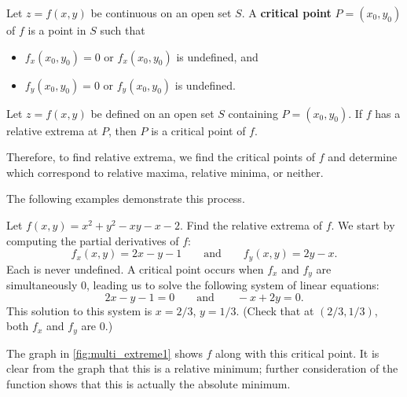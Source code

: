 \begin{definition}\label{def:multi_critical_point}%
Let $z = f(x,y)$ be continuous on an open set $S$. A \textbf{critical point} $P=(x_0,y_0)$ of $f$ is a point in $S$ such that
\begin{itemize}
	\item $f_x(x_0,y_0) = 0$ or $f_x(x_0,y_0)$ is undefined, and
	\item $f_y(x_0,y_0) = 0$ or $f_y(x_0,y_0)$ is undefined.
\end{itemize}
\end{definition}

\begin{theorem}\label{thm:multi_critical_point}%
Let $z=f(x,y)$ be defined on an open set $S$ containing $P=(x_0,y_0)$. If $f$ has a relative extrema at $P$, then $P$ is a critical point of $f$.
\end{theorem}

Therefore, to find relative extrema, we find the critical points of $f$ and determine which correspond to relative maxima, relative minima, or neither.


The following examples demonstrate this process.

\begin{example}\label{ex_multi_extreme1}%
Let $f(x,y) = x^2+y^2-xy-x-2$. Find the relative extrema of $f$.
\solution
We start by computing the partial derivatives of $f$:
%
%
\[f_x(x,y) = 2x-y-1 \qquad \text{and}\qquad f_y(x,y) = 2y-x.\]
Each is never undefined. A critical point occurs when $f_x$ and $f_y$ are simultaneously 0, leading us to solve the following system of linear equations:
\[2x-y-1 = 0\qquad \text{and}\qquad -x+2y = 0.\]
This solution to this system is $x=2/3$, $y=1/3$. (Check that at $(2/3,1/3)$, both $f_x$ and $f_y$ are 0.)

The graph in \autoref{fig:multi_extreme1} shows $f$ along with this critical point. It is clear from the graph that this is a relative minimum; further consideration of the function shows that this is actually the absolute minimum.
\end{example}

